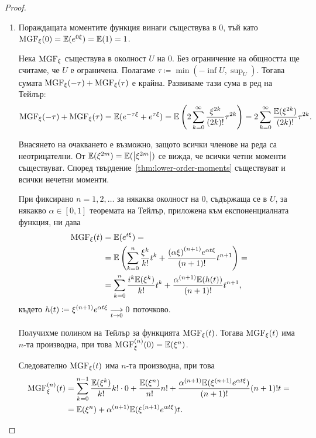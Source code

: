 \documentclass[numbers=endperiod, bibliography=totocnumbered]{scrartcl}
\begin{document}
\begin{proof}
  \mbox{}
  \begin{enumerate}
    \item Пораждащата моментите функция винаги съществува в \( 0 \), тъй като \( \MGF_\xi(0) = \Expect(e^{0\xi}) = \Expect(1) = 1 \).

    Нека \( \MGF_\xi \) съществува в околност \( U \) на \( 0 \). Без ограничение на общността ще считаме, че \( U \) е ограничена. Полагаме \( \tau \coloneqq \min(-\inf U, \sup_U) \). Тогава сумата \( \MGF_\xi(-\tau) + \MGF_\xi(\tau) \) е крайна. Развиваме тази сума в ред на Тейлър:
    \begin{align*}
      \MGF_\xi(-\tau) + \MGF_\xi(\tau)
      =
      \Expect(e^{-\tau\xi} + e^{\tau\xi})
      =
      \Expect\left( 2 \sum_{k=0}^\infty \frac {\xi^{2k}} {(2k)!} \tau^{2k} \right)
      =
      2 \sum_{k=0}^\infty \frac {\Expect(\xi^{2k})} {(2k)!} \tau^{2k}.
    \end{align*}

    Внасянето на очакването е възможно, защото всички членове на реда са неотрицателни. От \( \Expect(\xi^{2m}) = \Expect(\Abs{\xi^{2m}}) \) се вижда, че всички четни моменти съществуват. Според твърдение~\ref{thm:lower-order-moments} съществуват и всички нечетни моменти.

    При фиксирано \( n = 1, 2, \ldots \) за някаква околност на \( 0 \), съдържаща се в \( U \), за някакво \( \alpha \in [0, 1] \) теоремата на Тейлър, приложена към експоненциалната функция, ни дава
    \begin{align*}
      \MGF_\xi(t)
      &=
      \Expect(e^{t\xi})
      = \\ &=
      \Expect\left(\sum_{k=0}^n \frac {\xi^k} {k!} t^k + \frac {{(\alpha \xi)}^{(n+1)} e^{\alpha t \xi}} {(n+1)!} t^{n+1} \right)
      = \\ &=
      \sum_{k=0}^n \frac {i^k \Expect(\xi^k)} {k!} t^k + \frac {{\alpha}^{(n+1)} \Expect(h(t))} {(n+1)!} t^{n+1},
    \end{align*}
    където \( h(t) \coloneqq \xi^{(n+1)} e^{\alpha t \xi} \Conv[t \to 0]{} 0 \) поточково.

    Получихме полином на Тейлър за функцията \( \MGF_\xi(t) \). Тогава \( \MGF_\xi(t) \) има \( n \)-та производна, при това \( \MGF^{(n)}_\xi(0) = \Expect(\xi^n) \).

    Следователно \( \MGF_\xi(t) \) има \( n \)-та производна, при това
    \begin{align*}
      \MGF^{(n)}_\xi(t)
      &=
      \sum_{k=0}^{n-1} \frac {\Expect(\xi^k)} {k!} k! \cdot 0 + \frac {\Expect(\xi^n)} {n!} n! + \frac {\alpha^{(n+1)} \Expect(\xi^{(n+1)} e^{\alpha t \xi})} {(n+1)!} (n+1)! t
      = \\ &=
      \Expect(\xi^n) + \alpha^{(n+1)} \Expect(\xi^{(n+1)} e^{\alpha t \xi}) t.
    \end{align*}


\end{enumerate}
\end{proof}
\end{document}
